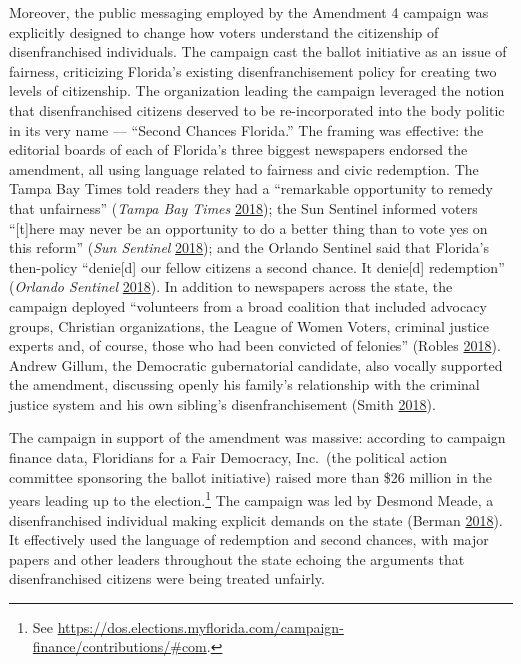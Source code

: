 \documentclass[
  12pt,
]{article}
\begin{document}
Moreover, the public messaging employed by the Amendment 4 campaign was explicitly designed to change how voters understand the citizenship of disenfranchised individuals. The campaign cast the ballot initiative as an issue of fairness, criticizing Florida's existing disenfranchisement policy for creating two levels of citizenship. The organization leading the campaign leveraged the notion that disenfranchised citizens deserved to be re-incorporated into the body politic in its very name --- ``Second Chances Florida.'' The framing was effective: the editorial boards of each of Florida's three biggest newspapers endorsed the amendment, all using language related to fairness and civic redemption. The Tampa Bay Times told readers they had a ``remarkable opportunity to remedy that unfairness'' (\emph{Tampa Bay Times} \protect\hyperlink{ref-tampabaytimes2018}{2018}); the Sun Sentinel informed voters ``{[}t{]}here may never be an opportunity to do a better thing than to vote yes on this reform'' (\emph{Sun Sentinel} \protect\hyperlink{ref-SunSentinelEditorial2018}{2018}); and the Orlando Sentinel said that Florida's then-policy ``denie{[}d{]} our fellow citizens a second chance. It denie{[}d{]} redemption'' (\emph{Orlando Sentinel} \protect\hyperlink{ref-ORLANDOSENTINEL2018}{2018}). In addition to newspapers across the state, the campaign deployed ``volunteers from a broad coalition that included advocacy groups, Christian organizations, the League of Women Voters, criminal justice experts and, of course, those who had been convicted of felonies'' (Robles \protect\hyperlink{ref-Robles2018}{2018}). Andrew Gillum, the Democratic gubernatorial candidate, also vocally supported the amendment, discussing openly his family's relationship with the criminal justice system and his own sibling's disenfranchisement (Smith \protect\hyperlink{ref-Smith2018}{2018}).

The campaign in support of the amendment was massive: according to campaign finance data, Floridians for a Fair Democracy, Inc.~(the political action committee sponsoring the ballot initiative) raised more than \$26 million in the years leading up to the election.\footnote{See \url{https://dos.elections.myflorida.com/campaign-finance/contributions/\#com}.} The campaign was led by Desmond Meade, a disenfranchised individual making explicit demands on the state (Berman \protect\hyperlink{ref-Berman2018}{2018}). It effectively used the language of redemption and second chances, with major papers and other leaders throughout the state echoing the arguments that disenfranchised citizens were being treated unfairly.
\end{document}

